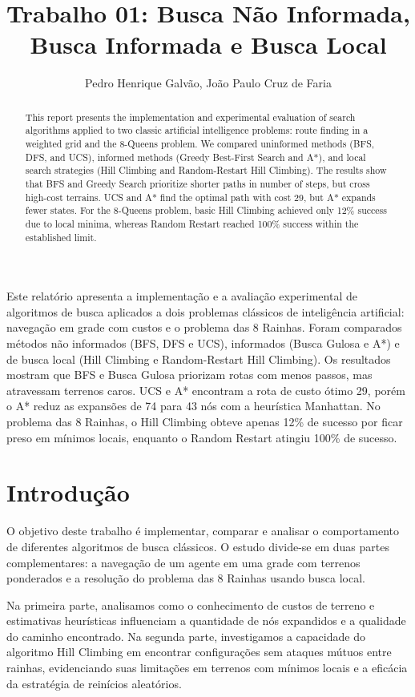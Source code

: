 \documentclass[12pt]{article}
\title{Trabalho 01: Busca Não Informada, Busca Informada e Busca Local}
\author{Pedro Henrique Galvão\inst{1}, João Paulo Cruz de Faria\inst{1}}
\begin{document}
\maketitle

\begin{abstract}
This report presents the implementation and experimental evaluation of search algorithms applied to two classic artificial intelligence problems: route finding in a weighted grid and the 8-Queens problem. We compared uninformed methods (BFS, DFS, and UCS), informed methods (Greedy Best-First Search and A*), and local search strategies (Hill Climbing and Random-Restart Hill Climbing). The results show that BFS and Greedy Search prioritize shorter paths in number of steps, but cross high-cost terrains. UCS and A* find the optimal path with cost 29, but A* expands fewer states. For the 8-Queens problem, basic Hill Climbing achieved only 12\% success due to local minima, whereas Random Restart reached 100\% success within the established limit.
\end{abstract}

\begin{resumo}
Este relatório apresenta a implementação e a avaliação experimental de algoritmos de busca aplicados a dois problemas clássicos de inteligência artificial: navegação em grade com custos e o problema das 8 Rainhas. Foram comparados métodos não informados (BFS, DFS e UCS), informados (Busca Gulosa e A*) e de busca local (Hill Climbing e Random-Restart Hill Climbing). Os resultados mostram que BFS e Busca Gulosa priorizam rotas com menos passos, mas atravessam terrenos caros. UCS e A* encontram a rota de custo ótimo 29, porém o A* reduz as expansões de 74 para 43 nós com a heurística Manhattan. No problema das 8 Rainhas, o Hill Climbing obteve apenas 12\% de sucesso por ficar preso em mínimos locais, enquanto o Random Restart atingiu 100\% de sucesso.
\end{resumo}

\section{Introdução}
O objetivo deste trabalho é implementar, comparar e analisar o comportamento de diferentes algoritmos de busca clássicos. O estudo divide-se em duas partes complementares: a navegação de um agente em uma grade com terrenos ponderados e a resolução do problema das 8 Rainhas usando busca local.

Na primeira parte, analisamos como o conhecimento de custos de terreno e estimativas heurísticas influenciam a quantidade de nós expandidos e a qualidade do caminho encontrado. Na segunda parte, investigamos a capacidade do algoritmo Hill Climbing em encontrar configurações sem ataques mútuos entre rainhas, evidenciando suas limitações em terrenos com mínimos locais e a eficácia da estratégia de reinícios aleatórios.
\end{document}
